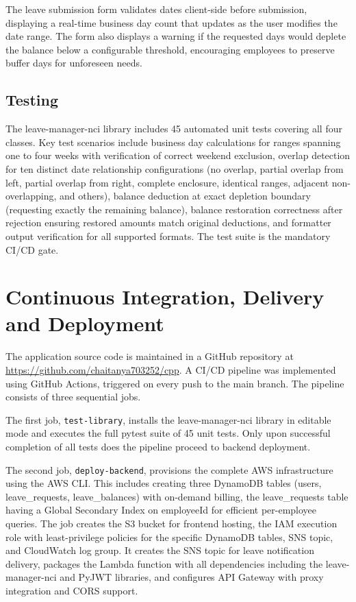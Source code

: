 \documentclass[conference]{IEEEtran}
\begin{document}
The leave submission form validates dates client-side before submission, displaying a real-time business day count that updates as the user modifies the date range. The form also displays a warning if the requested days would deplete the balance below a configurable threshold, encouraging employees to preserve buffer days for unforeseen needs.

\subsection{Testing}

The leave-manager-nci library includes 45 automated unit tests covering all four classes. Key test scenarios include business day calculations for ranges spanning one to four weeks with verification of correct weekend exclusion, overlap detection for ten distinct date relationship configurations (no overlap, partial overlap from left, partial overlap from right, complete enclosure, identical ranges, adjacent non-overlapping, and others), balance deduction at exact depletion boundary (requesting exactly the remaining balance), balance restoration correctness after rejection ensuring restored amounts match original deductions, and formatter output verification for all supported formats. The test suite is the mandatory CI/CD gate.

\section{Continuous Integration, Delivery and Deployment}

The application source code is maintained in a GitHub repository at \url{https://github.com/chaitanya703252/cpp}. A CI/CD pipeline was implemented using GitHub Actions, triggered on every push to the main branch. The pipeline consists of three sequential jobs.

The first job, \texttt{test-library}, installs the leave-manager-nci library in editable mode and executes the full pytest suite of 45 unit tests. Only upon successful completion of all tests does the pipeline proceed to backend deployment.

The second job, \texttt{deploy-backend}, provisions the complete AWS infrastructure using the AWS CLI. This includes creating three DynamoDB tables (users, leave\_requests, leave\_balances) with on-demand billing, the leave\_requests table having a Global Secondary Index on employeeId for efficient per-employee queries. The job creates the S3 bucket for frontend hosting, the IAM execution role with least-privilege policies for the specific DynamoDB tables, SNS topic, and CloudWatch log group. It creates the SNS topic for leave notification delivery, packages the Lambda function with all dependencies including the leave-manager-nci and PyJWT libraries, and configures API Gateway with proxy integration and CORS support.
\end{document}
